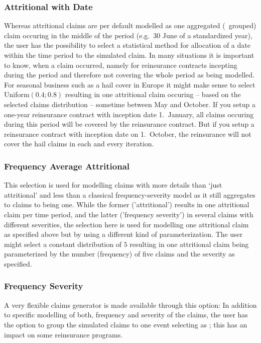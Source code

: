 \subsubsection*{Attritional with Date}\label{sec:AttritionalClaimDate}

Whereas attritional claims are per default modelled as one aggregated (\ie~grouped) claim occuring in the middle of the period (e.g.~30 June of a standardized year), the user has the possibility to select a statistical method for allocation of a date within the time period to the simulated claim. In many situations it is important to know, when a claim occurred, namely for reinsurance contracts incepting during the period and therefore not covering the whole period as being modelled. For seasonal business such as a hail cover in Europe it might make sense to select Uniform$(0.4;0.8)$ resulting in one attritional claim occuring -- based on the selected claims distribution -- sometime between May and October. If you setup a one-year reinsurance contract with inception date 1.~January, all claims occuring during this period will be covered by the reinsurance contract. But if you setup a reinsurance contract with inception date on 1.~October, the reinsurance will not cover the hail claims in each and every iteration.

\subsubsection*{Frequency Average Attritional}

This selection is used for modelling claims with more details than `just attritional' and less than a classical frequency-severity model as it still aggregates to claims to being one. While the former ('attritional') results in one attritional claim per time period, and the latter ('frequency severity') in several claims with different severities, the selection here is used for modelling one  attritional claim as specified above but by using a different kind of parameterization. The user might select a constant distribution of $5$ resulting in one attritional claim being parameterized by the number (frequency) of five claims and the severity as specified.

\subsubsection*{Frequency Severity}

A very flexible claims generator is made available through this option: In addition to specific modelling of both, frequency and severity of the claims, the user has the option to group the simulated claims to one event selecting  as ; this has an impact on some reinsurance programs.

